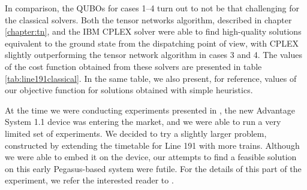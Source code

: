 In comparison, the QUBOs for cases 1--4 turn out to not be that challenging for
the classical solvers. Both the tensor networks algorithm, described in chapter
\ref{chapter:tn}, and the IBM CPLEX solver were able to find high-quality
solutions equivalent to the ground state from the dispatching point of view,
with CPLEX slightly outperforming the tensor network algorithm in cases 3 and
4. The values of the cost function obtained from these solvers are presented in
table \ref{tab:line191classical}. In the same table, we also present, for
reference, values of our objective function for solutions obtained with simple
heuristics.

At the time we were conducting experiments presented in
\cite{railwaydispatching}, the new Advantage System 1.1 device was entering the
market, and we were able to run a very limited set of experiments. We decided
to try a slightly larger problem, constructed by extending the timetable for
Line 191 with more trains. Although we were able to embed it on the device, our
attempts to find a feasible solution on this early Pegasus-based system were
futile. For the details of this part of the experiment, we refer the interested
reader to \cite{railwaydispatching}.

